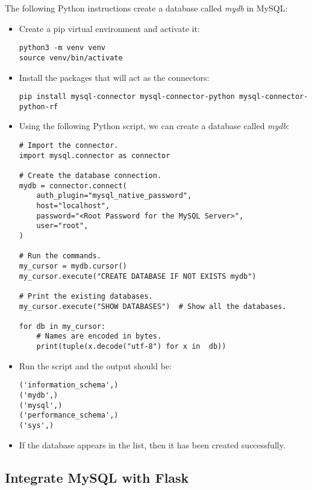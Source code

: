 The following Python instructions create a database called \textit{mydb} in MySQL:
\begin{itemize}
    \item Create a pip virtual environment and activate it:
    \begin{verbatim}
python3 -m venv venv
source venv/bin/activate
    \end{verbatim}
    \item Install the packages that will act as the connectors:
    \begin{verbatim}
pip install mysql-connector mysql-connector-python mysql-connector-python-rf
    \end{verbatim}
    \item Using the following Python script, we can create a database called \textit{mydb}:
    \begin{verbatim}
# Import the connector.
import mysql.connector as connector

# Create the database connection.
mydb = connector.connect(
    auth_plugin="mysql_native_password",
    host="localhost",
    password="<Root Password for the MySQL Server>",
    user="root",
)

# Run the commands.
my_cursor = mydb.cursor()
my_cursor.execute("CREATE DATABASE IF NOT EXISTS mydb")

# Print the existing databases.
my_cursor.execute("SHOW DATABASES")  # Show all the databases.

for db in my_cursor:
    # Names are encoded in bytes.
    print(tuple(x.decode("utf-8") for x in  db))
    \end{verbatim}
    \item Run the script and the output should be:
    \begin{verbatim}
('information_schema',)
('mydb',)
('mysql',)
('performance_schema',)
('sys',)
    \end{verbatim}
    \item If the database appears in the list, then it has been created successfully.
\end{itemize}

\subsection{Integrate MySQL with Flask}

